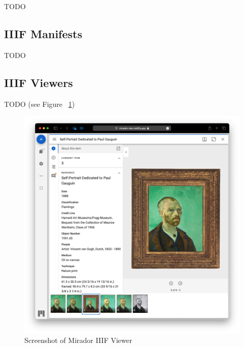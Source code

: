 TODO

\subsection{IIIF Manifests}

TODO

\subsection{IIIF Viewers}

TODO (see Figure ~\ref{fig:mirador})

\begin{figure}[htbp]
    \centering
	\includegraphics[width=\textwidth]{images/mirador.png}
	\caption{Screenshot of Mirador IIIF Viewer}
	\label{fig:mirador}
\end{figure}